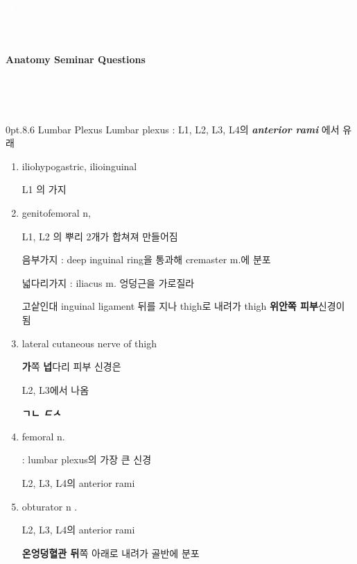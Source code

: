 \documentclass[10pt]{amsart}
\makeatletter
\newcommand{\reqnomode}{\tagsleft@false\let\veqno\@@eqno}\makeatother
\newcommand{\linebreakc}{\textcolor{white}{bl}\\}
\numberwithin{theorem}{section}
\numberwithin{example}{section}
\theoremstyle{definition}
\theoremstyle{remark}
\renewcommand\section{\@startsection{section}{1}%
{0pt}{.8\linespacing\@plus\linespacing}{.6\linespacing}%
{\LARGE\bfseries\color{black}}}
\makeatother
\begin{document}
 \reqnomode
{}

\begin{center}
\linebreakc
\linebreakc
\linebreakc
\huge

\textbf{Anatomy Seminar Questions}

\textcolor{white}{bl}\\

\Large


\end{center}

\textcolor{white}{bl}\\

\normalsize




\section{ Lumbar Plexus}
Lumbar plexus : L1, L2, L3, L4의 \textit{ \textbf{anterior rami}} 에서 유래 
\begin{enumerate}
\item 
iliohypogastric, ilioinguinal

L1 의 가지 
\item 
genitofemoral n, 


L1, L2 의 뿌리 2개가 합쳐져 만들어짐 


음부가지 
: deep inguinal ring을 통과해 
cremaster m.에 분포 

넓다리가지 
: iliacus m. 엉덩근을 가로질라 

고샅인대 inguinal ligament 뒤를 지나 thigh로 내려가 thigh \textbf{위안쪽 피부}신경이 됨 

\item lateral cutaneous nerve of thigh 

\textbf{가}쪽 \textbf{넙}다리 피부 신경은 

L2, L3에서 나옴 

\textbf{ㄱㄴ} \textit{\textbf{ㄷㅅ}} 
    \item femoral n. 
    
    : lumbar plexus의 가장 큰 신경
    
    L2, L3, L4의 anterior rami 
    
    \item  obturator n .
    
    L2, L3, L4의 anterior rami 
    
    \textbf{온엉덩혈관 뒤}\textit{}쪽 아래로 내려가 골반에 분포 
\end{enumerate}
\end{document}
